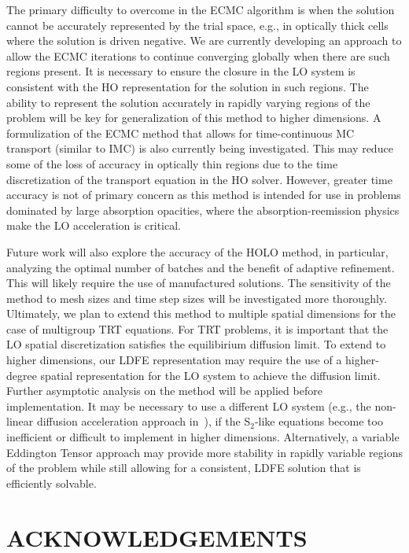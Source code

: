 \documentclass[12pt]{article}
\begin{document}
\begin{center}
The primary difficulty to overcome in the ECMC algorithm is when the solution cannot
be accurately represented by the trial space, e.g., in optically thick cells where
the solution is driven negative.   We are currently developing an approach to allow
the ECMC iterations to continue converging globally when there are such regions
present.  It is necessary to ensure the
 closure in the LO system is consistent with the HO
representation for the solution in such regions.  The ability to represent the solution accurately in
rapidly varying regions of the problem will be key for generalization of this method
to higher dimensions.  A formulization of the ECMC method
that allows for time-continuous MC transport (similar to IMC) is also currently being
investigated.  This may reduce some of the loss of accuracy in optically thin regions
due to the time discretization of the transport equation in the HO solver.
However, greater time accuracy is not of primary concern as this method is intended
for use in problems dominated by large absorption opacities, where the
absorption-reemission physics make the LO acceleration is critical.  

Future work will also explore the accuracy of the HOLO method, in particular,
analyzing the optimal number of batches and the benefit of adaptive refinement.  This will likely
require the use of manufactured solutions.  The sensitivity of the method to mesh sizes and time step sizes will be
investigated more thoroughly.  
Ultimately, we plan to extend this method to multiple spatial dimensions for the 
case of multigroup TRT equations.  For TRT problems, it is important that
the LO spatial discretization satisfies the equilibirium diffusion limit.  To extend
to higher dimensions, our LDFE representation may require the use of a higher-degree
spatial representation for the LO system to achieve the diffusion
limit. Further asymptotic
analysis on the method will be applied before implementation. It may be necessary to use a different LO system (e.g., the non-linear diffusion
acceleration approach in~\cite{rmc}), if the S$_2$-like equations become too
inefficient or difficult to implement in higher dimensions.  Alternatively, a
variable Eddington Tensor approach may provide more stability in rapidly variable
regions of the problem while still allowing for a consistent, LDFE solution that is efficiently solvable.

\section*{ACKNOWLEDGEMENTS}


\end{center}
\end{document}
